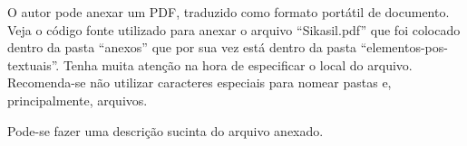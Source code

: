 \label{an:ex_anexo_b}

O autor pode anexar um \gls{PDF}, traduzido como formato portátil de documento. Veja o código fonte utilizado para anexar o arquivo ``Sikasil.pdf'' que foi colocado dentro da pasta ``anexos'' que por sua vez está dentro da pasta ``elementos-pos-textuais''. Tenha muita atenção na hora de especificar o local do arquivo. Recomenda-se não utilizar caracteres especiais para nomear pastas e, principalmente, arquivos. 

Pode-se fazer uma descrição sucinta do arquivo anexado.

% 

